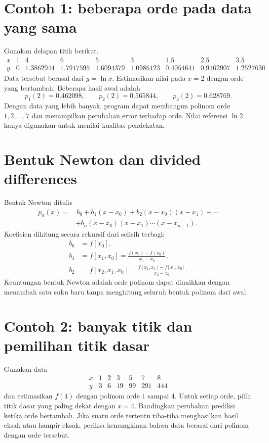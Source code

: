 \section{Contoh 1: beberapa orde pada data yang sama}
Gunakan delapan titik berikut.
\[
\begin{array}{c|rrrrrrrr}
x&1&4&6&5&3&1.5&2.5&3.5\\\hline
y&0&1.3862944&1.7917595&1.6094379&1.0986123&0.4054641&0.9162907&1.2527630
\end{array}
\]
Data tersebut berasal dari $y=\ln x$. Estimasikan nilai pada $x=2$ dengan orde yang bertambah. Beberapa hasil awal adalah
\[
p_1(2)=0.462098,\qquad
p_2(2)=0.565844,\qquad
p_3(2)=0.628769.
\]
Dengan data yang lebih banyak, program dapat membangun polinom orde $1,2,\ldots,7$ dan menampilkan perubahan error terhadap orde. Nilai referensi $\ln 2$ hanya digunakan untuk menilai kualitas pendekatan.

\section{Bentuk Newton dan divided differences}
Bentuk Newton ditulis
\begin{equation}
\begin{aligned}
p_n(x)=&\,b_0+b_1(x-x_0)+b_2(x-x_0)(x-x_1)+\cdots\\
&+b_n(x-x_0)(x-x_1)\cdots(x-x_{n-1}).
\end{aligned}
\end{equation}
Koefisien dihitung secara rekursif dari selisih terbagi:
\begin{align}
b_0&=f[x_0],\\
b_1&=f[x_1,x_0]=\frac{f(x_1)-f(x_0)}{x_1-x_0},\\
b_2&=f[x_2,x_1,x_0]
=\frac{f[x_2,x_1]-f[x_1,x_0]}{x_2-x_0}.
\end{align}
Keuntungan bentuk Newton adalah orde polinom dapat dinaikkan dengan menambah satu suku baru tanpa menghitung seluruh bentuk polinom dari awal.

\section{Contoh 2: banyak titik dan pemilihan titik dasar}
Gunakan data
\[
\begin{array}{c|rrrrrr}
x&1&2&3&5&7&8\\\hline
y&3&6&19&99&291&444
\end{array}
\]
dan estimasikan $f(4)$ dengan polinom orde $1$ sampai $4$. Untuk setiap orde, pilih titik dasar yang paling dekat dengan $x=4$. Bandingkan perubahan prediksi ketika orde bertambah. Jika suatu orde tertentu tiba-tiba menghasilkan hasil eksak atau hampir eksak, periksa kemungkinan bahwa data berasal dari polinom dengan orde tersebut.

